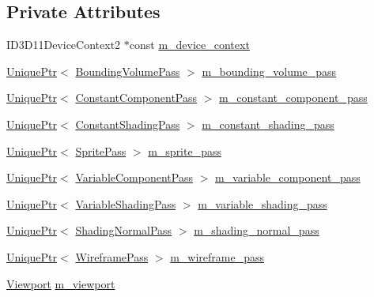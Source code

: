 \subsection*{Private Attributes}
\begin{DoxyCompactItemize}
\item 
I\+D3\+D11\+Device\+Context2 $\ast$const \hyperlink{classmage_1_1_scene_renderer_a163ff32807bea62e11fa06c5adf2a291}{m\+\_\+device\+\_\+context}
\item 
\hyperlink{namespacemage_a3316d7143a973e37adf1110f2e80ca31}{Unique\+Ptr}$<$ \hyperlink{classmage_1_1_bounding_volume_pass}{Bounding\+Volume\+Pass} $>$ \hyperlink{classmage_1_1_scene_renderer_a9d10194ae2ab807b241b078f8bb6430a}{m\+\_\+bounding\+\_\+volume\+\_\+pass}
\item 
\hyperlink{namespacemage_a3316d7143a973e37adf1110f2e80ca31}{Unique\+Ptr}$<$ \hyperlink{classmage_1_1_constant_component_pass}{Constant\+Component\+Pass} $>$ \hyperlink{classmage_1_1_scene_renderer_a34006a25d67bbe2aa4f25a61dee8cd2f}{m\+\_\+constant\+\_\+component\+\_\+pass}
\item 
\hyperlink{namespacemage_a3316d7143a973e37adf1110f2e80ca31}{Unique\+Ptr}$<$ \hyperlink{classmage_1_1_constant_shading_pass}{Constant\+Shading\+Pass} $>$ \hyperlink{classmage_1_1_scene_renderer_a2e98538d6add0603a2da5b949aa26953}{m\+\_\+constant\+\_\+shading\+\_\+pass}
\item 
\hyperlink{namespacemage_a3316d7143a973e37adf1110f2e80ca31}{Unique\+Ptr}$<$ \hyperlink{classmage_1_1_sprite_pass}{Sprite\+Pass} $>$ \hyperlink{classmage_1_1_scene_renderer_a39d0db7aa9275362cd460339143a089b}{m\+\_\+sprite\+\_\+pass}
\item 
\hyperlink{namespacemage_a3316d7143a973e37adf1110f2e80ca31}{Unique\+Ptr}$<$ \hyperlink{classmage_1_1_variable_component_pass}{Variable\+Component\+Pass} $>$ \hyperlink{classmage_1_1_scene_renderer_af3544515e1792eb3b1c1e511b1bccf46}{m\+\_\+variable\+\_\+component\+\_\+pass}
\item 
\hyperlink{namespacemage_a3316d7143a973e37adf1110f2e80ca31}{Unique\+Ptr}$<$ \hyperlink{classmage_1_1_variable_shading_pass}{Variable\+Shading\+Pass} $>$ \hyperlink{classmage_1_1_scene_renderer_a9ee6d267f8cfb7826c16acd4fe0b7852}{m\+\_\+variable\+\_\+shading\+\_\+pass}
\item 
\hyperlink{namespacemage_a3316d7143a973e37adf1110f2e80ca31}{Unique\+Ptr}$<$ \hyperlink{classmage_1_1_shading_normal_pass}{Shading\+Normal\+Pass} $>$ \hyperlink{classmage_1_1_scene_renderer_a183c95ded274991bc80dccd8a373cce5}{m\+\_\+shading\+\_\+normal\+\_\+pass}
\item 
\hyperlink{namespacemage_a3316d7143a973e37adf1110f2e80ca31}{Unique\+Ptr}$<$ \hyperlink{classmage_1_1_wireframe_pass}{Wireframe\+Pass} $>$ \hyperlink{classmage_1_1_scene_renderer_a3f84786f9ed001345c746292cb08ad2f}{m\+\_\+wireframe\+\_\+pass}
\item 
\hyperlink{structmage_1_1_viewport}{Viewport} \hyperlink{classmage_1_1_scene_renderer_a10ea57172c4a79a3b4d4a8161e705437}{m\+\_\+viewport}
\end{DoxyCompactItemize}


